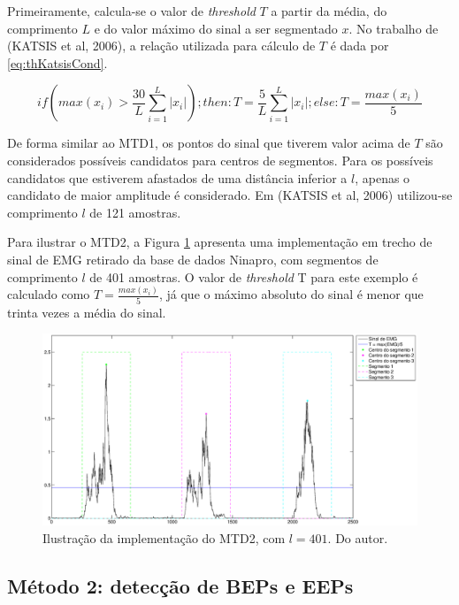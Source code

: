 \documentclass[
	12pt,				%
	openright,			%
	oneside,
	a4paper,			%
	english,			%
	francais,			%
	spanish,			%
	brazil				%
	]{abntex2}
\begin{document}
	Primeiramente, calcula-se o valor de \emph{threshold} $T$ a partir da média, do comprimento $L$ e do valor máximo do sinal a ser segmentado $x$. No trabalho de (KATSIS et al, 2006), a relação utilizada para cálculo de $T$ é dada por \ref{eq:thKatsisCond}.

\begin{equation}
\label{eq:thKatsisCond}
	if\left(max(x_i) > \frac{30}{L}\sum_{i=1}^{L}|x_i|\right); then: T = \frac{5}{L}\sum_{i=1}^{L}|x_i|; else: T = \frac{max(x_i)}{5}
\end{equation}

	De forma similar ao MTD1, os pontos do sinal que tiverem valor acima de $T$ são considerados possíveis candidatos para centros de segmentos. Para os possíveis candidatos que estiverem afastados de uma distância inferior a $l$, apenas o candidato de maior amplitude é considerado. Em (KATSIS et al, 2006) utilizou-se comprimento $l$ de 121 amostras.
	
	Para ilustrar o MTD2, a Figura \ref{fig:mtd1example} apresenta uma implementação em trecho de sinal de EMG retirado da base de dados Ninapro, com segmentos de comprimento $l$ de 401 amostras. O valor de \emph{threshold} T para este exemplo é calculado como $T = \frac{max(x_i)}{5}$, já que o máximo absoluto do sinal é menor que trinta vezes a média do sinal.

\begin{figure}
\centering
\includegraphics[width=\linewidth]{./img/mtd2example.eps}
\caption{Ilustração da implementação do MTD2, com $l = 401$. Do autor.}
\label{fig:mtd1example}
\end{figure}
	
\subsection{Método 2: detecção de BEPs e EEPs}
\end{document}
